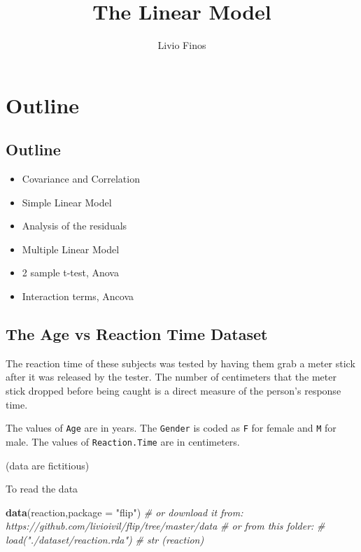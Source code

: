 \documentclass[
]{article}
\title{The Linear Model}
\author{Livio Finos}
\date{}
\newenvironment{Shaded}{\begin{snugshade}}{\end{snugshade}}
\newcommand{\CommentTok}[1]{\textcolor[rgb]{0.56,0.35,0.01}{\textit{#1}}}
\newcommand{\DataTypeTok}[1]{\textcolor[rgb]{0.13,0.29,0.53}{#1}}
\newcommand{\KeywordTok}[1]{\textcolor[rgb]{0.13,0.29,0.53}{\textbf{#1}}}
\newcommand{\NormalTok}[1]{#1}
\newcommand{\StringTok}[1]{\textcolor[rgb]{0.31,0.60,0.02}{#1}}
\providecommand{\tightlist}{%
  \setlength{\itemsep}{0pt}\setlength{\parskip}{0pt}}
\begin{document}
\maketitle

{
\setcounter{tocdepth}{2}
\tableofcontents
}
\hypertarget{outline}{%
\section{Outline}\label{outline}}

\hypertarget{outline-1}{%
\subsection{Outline}\label{outline-1}}

\begin{itemize}
\tightlist
\item
  Covariance and Correlation
\item
  Simple Linear Model
\item
  Analysis of the residuals
\item
  Multiple Linear Model
\item
  2 sample t-test, Anova
\item
  Interaction terms, Ancova
\end{itemize}

\hypertarget{the-age-vs-reaction-time-dataset}{%
\subsection{The Age vs Reaction Time
Dataset}\label{the-age-vs-reaction-time-dataset}}

The reaction time of these subjects was tested by having them grab a
meter stick after it was released by the tester. The number of
centimeters that the meter stick dropped before being caught is a direct
measure of the person's response time.

The values of \texttt{Age} are in years. The \texttt{Gender} is coded as
\texttt{F} for female and \texttt{M} for male. The values of
\texttt{Reaction.Time} are in centimeters.

(data are fictitious)

To read the data

\begin{Shaded}
\begin{Highlighting}[]
\KeywordTok{data}\NormalTok{(reaction,}\DataTypeTok{package =} \StringTok{"flip"}\NormalTok{)}
\CommentTok{# or download it from: https://github.com/livioivil/flip/tree/master/data}
\CommentTok{# or from this folder:}
\CommentTok{# load("./dataset/reaction.rda")}
\CommentTok{# str (reaction)}
\end{Highlighting}
\end{Shaded}
\end{document}
